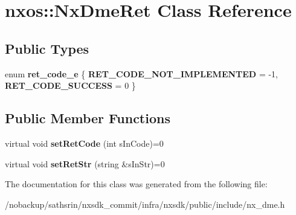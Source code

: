 \hypertarget{classnxos_1_1NxDmeRet}{\section{nxos\-:\-:Nx\-Dme\-Ret Class Reference}
\label{classnxos_1_1NxDmeRet}
}
\subsection*{Public Types}
\begin{DoxyCompactItemize}
\item 
enum {\bfseries ret\-\_\-code\-\_\-e} \{ {\bfseries R\-E\-T\-\_\-\-C\-O\-D\-E\-\_\-\-N\-O\-T\-\_\-\-I\-M\-P\-L\-E\-M\-E\-N\-T\-E\-D} = -\/1, 
{\bfseries R\-E\-T\-\_\-\-C\-O\-D\-E\-\_\-\-S\-U\-C\-C\-E\-S\-S} = 0
 \}
\end{DoxyCompactItemize}
\subsection*{Public Member Functions}
\begin{DoxyCompactItemize}
\item 
\hypertarget{classnxos_1_1NxDmeRet_a08d03053b4b4185c94d2fe025b123caf}{virtual void {\bfseries set\-Ret\-Code} (int s\-In\-Code)=0}\label{classnxos_1_1NxDmeRet_a08d03053b4b4185c94d2fe025b123caf}

\item 
\hypertarget{classnxos_1_1NxDmeRet_a8c3ce32345d18fc569cc04cad7708f3b}{virtual void {\bfseries set\-Ret\-Str} (string \&s\-In\-Str)=0}\label{classnxos_1_1NxDmeRet_a8c3ce32345d18fc569cc04cad7708f3b}

\end{DoxyCompactItemize}


The documentation for this class was generated from the following file\-:\begin{DoxyCompactItemize}
\item 
/nobackup/sathsrin/nxsdk\-\_\-commit/infra/nxsdk/public/include/nx\-\_\-dme.\-h\end{DoxyCompactItemize}
